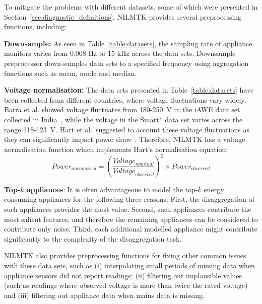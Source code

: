 \documentclass{sig-alternate}
\newcommand{\redcolor}[1]{\textcolor{red}{#1}}
\newcommand{\secref}[1]{Section~\ref{#1}}
\newcommand{\tabref}[1]{Table~\ref{#1}}
\begin{document}
\noindent
To mitigate the problems  with different datasets, some of which were presented in \secref{sec:diagnostic_definitions}, NILMTK provides several preprocessing functions, including:

\textbf{Downsample:} As seen in \tabref{table:datasets}, the sampling rate of appliance monitors varies
from 0.008 Hz to 15 kHz across the data sets. Downsample preprocessor down-samples data sets to a specified frequency using aggregation functions such as mean, mode and median.

\textbf{Voltage normalisation:} The data sets presented in \tabref{table:datasets} have been
collected from different countries, where voltage fluctuations vary
widely. Batra et al. showed voltage fluctuates from 180-250~V in the
iAWE data set collected in India~\cite{iawe}, while the voltage in the
Smart* data set varies across the range 118-123~V. Hart et al.\ suggested to account these voltage fluctuations as they can
significantly impact power draw~\cite{hart_1992}. Therefore, NILMTK
has a voltage normalisation function which implements Hart's
normalisation equation:
\begin{equation}
\textit{Power}_{\textit{normalised}} = 
\left(\frac{\textit{Voltage}_{\textit{nominal}}}{\textit{Voltage}_{\textit{observed}}}\right)^2 
\times \textit{Power}_{\textit{observed}}
\end{equation}

\textbf{Top-$k$ appliances}: It is often advantageous to model the top-$k$ energy consuming appliances for the following three reasons. 
First, the disaggregation of such appliances provides the most value. Second, such appliances contribute the most salient features, and therefore the remaining appliances can be considered to contribute only noise. Third, each additional modelled appliance might contribute significantly to the complexity of the disaggregation task.


NILMTK also provides preprocessing functions for fixing
other common issues with these data sets, such as (i) interpolating
small periods of missing data when appliance sensors did not report
readings; (ii) filtering out implausible values (such as readings
where observed voltage is more than twice the rated voltage) and (iii)
filtering out appliance data when mains data is missing.
\end{document}
